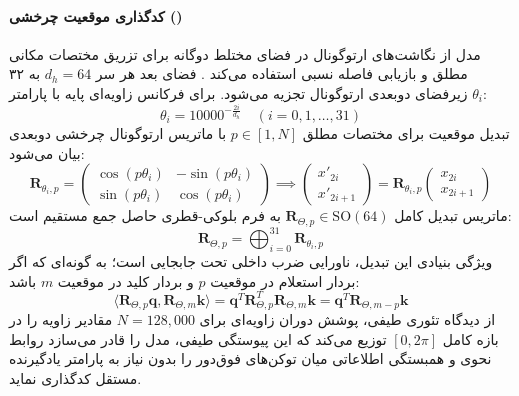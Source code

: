 \paragraph*{کدگذاری موقعیت چرخشی ()}
مدل  از نگاشت‌های ارتوگونال در فضای مختلط دوگانه برای تزریق مختصات مکانی مطلق و بازیابی فاصله نسبی استفاده می‌کند \cite{su2024roformer}. فضای بعد هر سر $d_h = 64$ به ۳۲ زیرفضای دوبعدی ارتوگونال تجزیه می‌شود. برای فرکانس زاویه‌ای پایه با پارامتر $\theta_i$:
\begin{equation}
    \theta_i = 10000^{-\frac{2i}{d_h}} \quad (i = 0, 1, \dots, 31)
\end{equation}
تبدیل موقعیت برای مختصات مطلق $p \in [1, N]$ با ماتریس ارتوگونال چرخشی دوبعدی بیان می‌شود:
\begin{equation}
    \mathbf{R}_{\theta_i, p} = \begin{pmatrix} \cos(p\theta_i) & -\sin(p\theta_i) \\ \sin(p\theta_i) & \cos(p\theta_i) \end{pmatrix} \implies \begin{pmatrix} x'_{2i} \\ x'_{2i+1} \end{pmatrix} = \mathbf{R}_{\theta_i, p} \begin{pmatrix} x_{2i} \\ x_{2i+1} \end{pmatrix}
\end{equation}
ماتریس تبدیل کامل $\mathbf{R}_{\Theta, p} \in \mathrm{SO}(64)$ به فرم بلوکی-قطری حاصل جمع مستقیم است:
\begin{equation}
    \mathbf{R}_{\Theta, p} = \bigoplus_{i=0}^{31} \mathbf{R}_{\theta_i, p}
\end{equation}
ویژگی بنیادی این تبدیل، ناورایی ضرب داخلی تحت جابجایی است؛ به گونه‌ای که اگر بردار استعلام در موقعیت $p$ و بردار کلید در موقعیت $m$ باشد:
\begin{equation}
    \langle \mathbf{R}_{\Theta, p} \mathbf{q}, \mathbf{R}_{\Theta, m} \mathbf{k} \rangle = \mathbf{q}^T \mathbf{R}_{\Theta, p}^T \mathbf{R}_{\Theta, m} \mathbf{k} = \mathbf{q}^T \mathbf{R}_{\Theta, m-p} \mathbf{k}
\end{equation}
از دیدگاه تئوری طیفی، پوشش دوران زاویه‌ای برای $N = 128{,}000$ مقادیر زاویه را در بازه کامل $[0, 2\pi]$ توزیع می‌کند که این پیوستگی طیفی، مدل را قادر می‌سازد روابط نحوی و همبستگی اطلاعاتی میان توکن‌های فوق‌دور را بدون نیاز به پارامتر یادگیرنده مستقل کدگذاری نماید.

